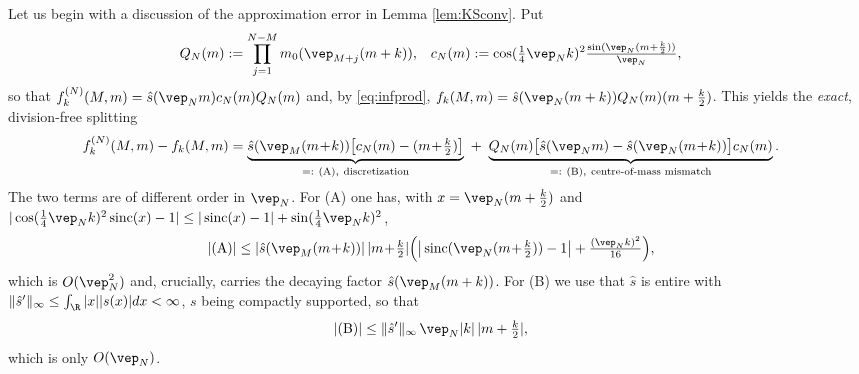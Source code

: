 \documentclass[a4paper, 11pt]{article}
\DeclareMathOperator{\1}{\mathds{1}}
\DeclareMathOperator{\sinc}{sinc}
\begin{document}
\bigskip

Let us begin with a discussion of the approximation error in Lemma \ref{lem:KSconv}. Put
\begin{align*}
Q_{N}(m) & := \prod_{j=1}^{N-M}m_{0}(\vep_{M+j}(m+k)), & c_{N}(m) & := \cos(\tfrac{1}{4}\vep_{N}k)^{2}\tfrac{\sin(\vep_{N}(m+\frac{k}{2}))}{\vep_{N}},
\end{align*}
so that $f^{(N)}_{k}(M,m) = \hat{s}(\vep_{N}m)c_{N}(m)Q_{N}(m)$ and, by \eqref{eq:infprod}, $f_{k}(M,m) = \hat{s}(\vep_{N}(m+k))Q_{N}(m)(m+\tfrac{k}{2})$. This yields the \emph{exact}, division-free splitting
\begin{align}
\label{eq:uniformestimate}
f^{(N)}_{k}(M,m)-f_{k}(M,m) & = \underbrace{\hat{s}(\vep_{M}(m\!+\!k))\big[c_{N}(m)-(m\!+\!\tfrac{k}{2})\big]}_{=:\ \textup{(A)},\ \textup{discretization}}\ +\ \underbrace{Q_{N}(m)\big[\hat{s}(\vep_{N}m)-\hat{s}(\vep_{N}(m\!+\!k))\big]c_{N}(m)}_{=:\ \textup{(B)},\ \textup{centre-of-mass mismatch}} .
\end{align}
The two terms are of different order in $\vep_{N}$. For (A) one has, with $x=\vep_{N}(m+\tfrac{k}{2})$ and $|\cos(\tfrac{1}{4}\vep_{N}k)^{2}\sinc(x)-1|\leq|\sinc(x)-1|+\sin(\tfrac{1}{4}\vep_{N}k)^{2}$,
\begin{align}
\label{eq:errortermA}
|\textup{(A)}| & \leq |\hat{s}(\vep_{M}(m\!+\!k))|\!\ |m\!+\!\tfrac{k}{2}|\Big(\big|\sinc(\vep_{N}(m\!+\!\tfrac{k}{2}))-1\big|+\tfrac{(\vep_{N}k)^{2}}{16}\Big),
\end{align}
which is $O(\vep_{N}^{2})$ and, crucially, carries the decaying factor $\hat{s}(\vep_{M}(m+k))$. For (B) we use that $\hat{s}$ is entire with $\|\hat{s}'\|_{\infty}\leq\int_{\R}|x||s(x)|dx<\infty$, $s$ being compactly supported, so that
\begin{align}
\label{eq:errortermB}
|\textup{(B)}| & \leq \|\hat{s}'\|_{\infty}\!\ \vep_{N}|k|\!\ |m+\tfrac{k}{2}|,
\end{align}
which is only $O(\vep_{N})$.

\medskip
\end{document}
